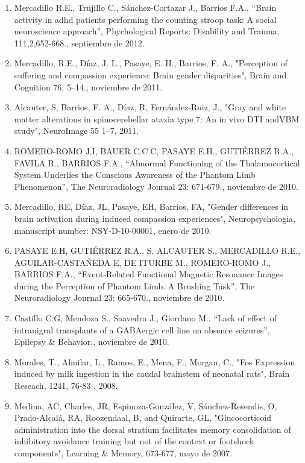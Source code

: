 \begin{enumerate}
\item Mercadillo R.E., Trujillo C., Sánchez-Cortazar J., Barrios F.A., “Brain activity in adhd patients performing the counting stroop task: A social 
neuroscience 
approach”, Phychological Reports: Disability and Trauma, 111,2,652-668.,  septiembre de 2012.

\item Mercadillo, R.E., Díaz, J. L., Pasaye, E. H., Barrios, F. A., "Perception of suffering and compassion experience: Brain gender disparities", Brain and 
Cognition 76, 5–14.,  noviembre de 2011.

\item Alcauter, S, Barrios, F. A., Díaz, R, Fernández-Ruiz, J., "Gray and white matter alterations in spinocerebellar ataxia type 7: An in vivo DTI andVBM 
study", 
NeuroImage 55 1–7,  2011.

\item ROMERO-ROMO J.I, BAUER C.C.C, PASAYE E.H., GUTIÉRREZ R.A., FAVILA R., BARRIOS F.A., “Abnormal Functioning of the Thalamocortical System Underlies the 
Conscious Awareness of the Phantom Limb Phenomenon”, The Neuroradiology Journal 23: 671-679.,  noviembre de 2010.

\item Mercadillo, RE, Díaz, JL, Pasaye, EH, Barrios, FA, "Gender differences in brain activation during induced compassion experiences", Neuropsychologia, 
manuscript number: NSY-D-10-00001,  enero de 2010.

\item PASAYE E.H, GUTIÉRREZ R.A., S. ALCAUTER S., MERCADILLO R.E., AGUILAR-CASTAÑEDA E, DE ITURBE M., ROMERO-ROMO J., BARRIOS F.A., “Event-Related Functional 
Magnetic Resonance Images during the Perception of Phantom Limb. A Brushing Task”, The Neuroradiology Journal 23: 665-670.,  noviembre de 2010.

\item Castillo C.G, Mendoza S., Saavedra J., Giordano M., “Lack of effect of intranigral transplants of a GABAergic cell line on absence seizures”, Epilepsy \& 
Behavior.,  noviembre de 2010.

\item Morales, T., Ahuilar, L., Ramos, E., Mena, F., Morgan, C., "Fos Expression induced by milk ingestion in the caudal brainstem of neonatal rats", Brain 
Reseach, 1241, 76-83 ,  2008.

\item Medina, AC, Charles, JR, Espinoza-González, V, Sánchez-Resendis, O, Prado-Alcalá, RA, Roozendaal, B, and Quirarte, GL, "Glucocorticoid administration into 
the dorsal stratium facilitates memory consolidation of inhibitory avoidance training but not of the context or footshock components", Learning \& Memory, 
673-677,  mayo de 2007.


\end{enumerate}
